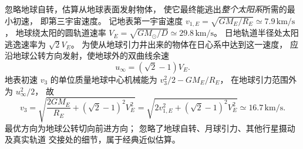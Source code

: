 忽略地球自转，估算从地球表面发射物体，
使它最终能逃出\emph{整个太阳系}所需的最小初速，
即第三宇宙速度。
\exsolution
记地表第一宇宙速度
$v_{1,E}=\sqrt{GM_E/R_E}\simeq7.9\,\mathrm{km/s}$，
地球绕太阳的圆轨道速率
$V_E=\sqrt{GM_\odot/D}\simeq29.8\,\mathrm{km/s}$。
日地轨道半径处太阳逃逸速率为 $\sqrt2V_E$。
为使从地球引力井出来的物体在日心系中达到这一速度，
应沿地球公转方向发射，使地球外的双曲线余速
\[
u_\infty=(\sqrt2-1)V_E.
\]
地表初速 $v_3$ 的单位质量地球中心机械能为
$v_3^2/2-GM_E/R_E$，
在地球引力范围外为 $u_\infty^2/2$，
故
\[
\boxed{v_3=
\sqrt{\frac{2GM_E}{R_E}
+(\sqrt2-1)^2V_E^2}
=\sqrt{2v_{1,E}^2+(\sqrt2-1)^2V_E^2}
\simeq16.7\,\mathrm{km/s}}.
\]
\excheck 最优方向为地球公转切向前进方向；
忽略了地球自转、月球引力、其他行星摄动及真实轨道
交接处的细节，属于经典近似估算。
